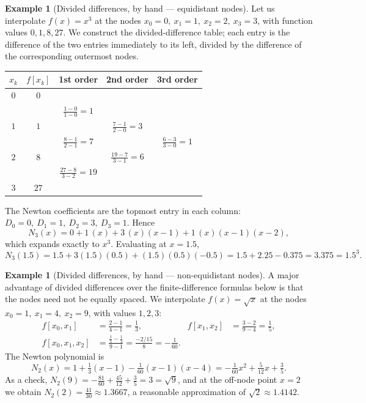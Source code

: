 \documentclass[12pt, a4paper]{article}
\theoremstyle{plain}
\theoremstyle{definition}
\newtheorem{example}[theorem]{Example}
\theoremstyle{remark}
\begin{document}
\begin{example}[Divided differences, by hand --- equidistant nodes]\label{ex:dd1}
Let us interpolate $f(x) = x^3$ at the nodes $x_0 = 0,\ x_1 = 1,\ x_2 = 2,\ x_3 = 3$, with function values $0, 1, 8, 27$. We construct the divided-difference table; each entry is the difference of the two entries immediately to its left, divided by the difference of the corresponding outermost nodes.

\begin{center}
\renewcommand{\arraystretch}{1.4}
\begin{tabular}{c|c|c|c|c}
$x_k$ & $f[x_k]$ & 1st order & 2nd order & 3rd order \\
\hline
$0$ & $0$  &                       &                         & \\
    &      & $\frac{1-0}{1-0}=1$   &                         & \\
$1$ & $1$  &                       & $\frac{7-1}{2-0}=3$     & \\
    &      & $\frac{8-1}{2-1}=7$   &                         & $\frac{6-3}{3-0}=1$ \\
$2$ & $8$  &                       & $\frac{19-7}{3-1}=6$    & \\
    &      & $\frac{27-8}{3-2}=19$ &                         & \\
$3$ & $27$ &                       &                         & \\
\end{tabular}
\end{center}

The Newton coefficients are the topmost entry in each column: $D_0 = 0,\ D_1 = 1,\ D_2 = 3,\ D_3 = 1$. Hence
\begin{equation*}
    N_3(x) = 0 + 1\,(x) + 3\,(x)(x-1) + 1\,(x)(x-1)(x-2),
\end{equation*}
which expands exactly to $x^3$. Evaluating at $x = 1.5$,
\[
N_3(1.5) = 1.5 + 3(1.5)(0.5) + (1.5)(0.5)(-0.5) = 1.5 + 2.25 - 0.375 = 3.375 = 1.5^3 .
\]
\end{example}

\begin{example}[Divided differences, by hand --- non-equidistant nodes]\label{ex:dd2}
A major advantage of divided differences over the finite-difference formulas below is that the nodes need not be equally spaced. We interpolate $f(x) = \sqrt{x}$ at the nodes $x_0 = 1,\ x_1 = 4,\ x_2 = 9$, with values $1, 2, 3$:
\begin{align*}
    f[x_0, x_1] &= \frac{2-1}{4-1} = \frac{1}{3}, &
    f[x_1, x_2] &= \frac{3-2}{9-4} = \frac{1}{5}, \\[2pt]
    f[x_0, x_1, x_2] &= \frac{\tfrac{1}{5}-\tfrac{1}{3}}{9-1} = \frac{-2/15}{8} = -\frac{1}{60}. &&
\end{align*}
The Newton polynomial is
\[
    N_2(x) = 1 + \tfrac{1}{3}(x-1) - \tfrac{1}{60}(x-1)(x-4) = -\tfrac{1}{60}x^2 + \tfrac{5}{12}x + \tfrac{3}{5}.
\]
As a check, $N_2(9) = -\tfrac{81}{60} + \tfrac{45}{12} + \tfrac{3}{5} = 3 = \sqrt{9}$, and at the off-node point $x=2$ we obtain $N_2(2) = \tfrac{41}{30} \approx 1.3667$, a reasonable approximation of $\sqrt{2} \approx 1.4142$.
\end{example}
\end{document}

